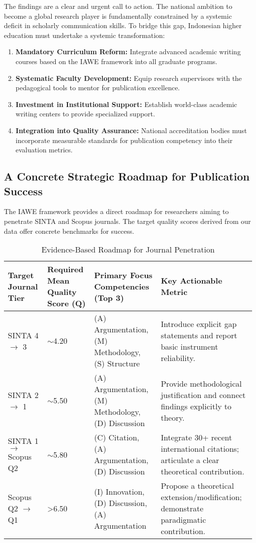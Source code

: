 \documentclass[journal,article,submit,pdftex,moreauthors]{Definitions/mdpi}
\begin{document}
The findings are a clear and urgent call to action. The national ambition to become a global research player is fundamentally constrained by a systemic deficit in scholarly communication skills. To bridge this gap, Indonesian higher education must undertake a systemic transformation:
\begin{enumerate}
\item \textbf{Mandatory Curriculum Reform:} Integrate advanced academic writing courses based on the IAWE framework into all graduate programs.
\item \textbf{Systematic Faculty Development:} Equip research supervisors with the pedagogical tools to mentor for publication excellence.
\item \textbf{Investment in Institutional Support:} Establish world-class academic writing centers to provide specialized support.
\item \textbf{Integration into Quality Assurance:} National accreditation bodies must incorporate measurable standards for publication competency into their evaluation metrics.
\end{enumerate}

\subsection{A Concrete Strategic Roadmap for Publication Success}

The IAWE framework provides a direct roadmap for researchers aiming to penetrate SINTA and Scopus journals. The target quality scores derived from our data offer concrete benchmarks for success.

\begin{table}[H]
\caption{Evidence-Based Roadmap for Journal Penetration\label{tab2}}
\begin{tabularx}{\textwidth}{XXXX}
\toprule
\textbf{Target Journal Tier} & \textbf{Required Mean Quality Score (Q)} & \textbf{Primary Focus Competencies (Top 3)} & \textbf{Key Actionable Metric}\\
\midrule
SINTA 4 $\rightarrow$ 3 & $\sim$4.20 & (A) Argumentation, (M) Methodology, (S) Structure & Introduce explicit gap statements and report basic instrument reliability.\\
SINTA 2 $\rightarrow$ 1 & $\sim$5.50 & (A) Argumentation, (M) Methodology, (D) Discussion & Provide methodological justification and connect findings explicitly to theory.\\
SINTA 1 $\rightarrow$ Scopus Q2 & $\sim$5.80 & (C) Citation, (A) Argumentation, (D) Discussion & Integrate 30+ recent international citations; articulate a clear theoretical contribution.\\
Scopus Q2 $\rightarrow$ Q1 & >6.50 & (I) Innovation, (D) Discussion, (A) Argumentation & Propose a theoretical extension/modification; demonstrate paradigmatic contribution.\\
\bottomrule
\end{tabularx}
\end{table}
\end{document}
